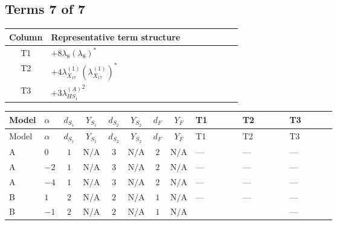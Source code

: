 \documentclass[8pt]{article}
\begin{document}
\begin{landscape}
\subsection*{Terms 7 of 7}
\begin{center}
\begin{tabular}{@{}c >{\raggedright\arraybackslash}p{0.82\linewidth}@{}}
\toprule
Column & Representative term structure \\
\midrule
T1 & \(\displaystyle +8 {\lambda_{8}} \left({\lambda_{8}}\right)^{*}\) \\
\midrule
T2 & \(\displaystyle +4 {\lambda_{X_{17}}^{(1)}} \left({\lambda_{X_{17}}^{(1)}}\right)^{*}\) \\
\midrule
T3 & \(\displaystyle +3 {\lambda_{HS_1}^{(A)}}^2\) \\
\midrule
\bottomrule
\end{tabular}
\end{center}
\smallskip
\tiny
\begin{longtable}{@{}llcccccc >{\raggedright\arraybackslash}p{0.21\linewidth} >{\raggedright\arraybackslash}p{0.21\linewidth} >{\raggedright\arraybackslash}p{0.21\linewidth}@{}}
\toprule
Model & $\alpha$ & $d_{S_1}$ & $Y_{S_1}$ & $d_{S_2}$ & $Y_{S_2}$ & $d_F$ & $Y_F$ & T1 & T2 & T3 \\
\midrule
\endfirsthead
\toprule
Model & $\alpha$ & $d_{S_1}$ & $Y_{S_1}$ & $d_{S_2}$ & $Y_{S_2}$ & $d_F$ & $Y_F$ & T1 & T2 & T3 \\
\midrule
\endhead
A & $0$ & $1$ & $\text{N/A}$ & $3$ & $\text{N/A}$ & $2$ & $\text{N/A}$ & --- & --- & --- \\
\midrule
A & $-2$ & $1$ & $\text{N/A}$ & $3$ & $\text{N/A}$ & $2$ & $\text{N/A}$ & --- & --- & --- \\
\midrule
A & $-4$ & $1$ & $\text{N/A}$ & $3$ & $\text{N/A}$ & $2$ & $\text{N/A}$ & --- & --- & --- \\
\midrule
B & $1$ & $2$ & $\text{N/A}$ & $2$ & $\text{N/A}$ & $1$ & $\text{N/A}$ & --- & --- & --- \\
\midrule
B & $-1$ & $2$ & $\text{N/A}$ & $2$ & $\text{N/A}$ & $1$ & $\text{N/A}$ & \scriptsize\adjustbox{max width=\linewidth}{$\begin{gathered} +8 {\lambda_{8}} \left({\lambda_{8}}\right)^{*}\end{gathered}$} & \scriptsize\adjustbox{max width=\linewidth}{$\begin{gathered} +4 {\lambda_{X_{17}}^{(1)}} \left({\lambda_{X_{17}}^{(1)}}\right)^{*}\end{gathered}$} & --- \\

\end{longtable}
\end{landscape}
\end{document}
